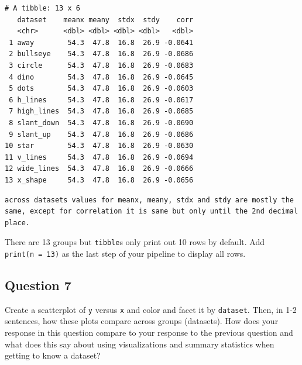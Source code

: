 \documentclass[
  letterpaper,
  DIV=11,
  numbers=noendperiod]{scrartcl}
\begin{document}
\begin{verbatim}
# A tibble: 13 x 6
   dataset    meanx meany  stdx  stdy    corr
   <chr>      <dbl> <dbl> <dbl> <dbl>   <dbl>
 1 away        54.3  47.8  16.8  26.9 -0.0641
 2 bullseye    54.3  47.8  16.8  26.9 -0.0686
 3 circle      54.3  47.8  16.8  26.9 -0.0683
 4 dino        54.3  47.8  16.8  26.9 -0.0645
 5 dots        54.3  47.8  16.8  26.9 -0.0603
 6 h_lines     54.3  47.8  16.8  26.9 -0.0617
 7 high_lines  54.3  47.8  16.8  26.9 -0.0685
 8 slant_down  54.3  47.8  16.8  26.9 -0.0690
 9 slant_up    54.3  47.8  16.8  26.9 -0.0686
10 star        54.3  47.8  16.8  26.9 -0.0630
11 v_lines     54.3  47.8  16.8  26.9 -0.0694
12 wide_lines  54.3  47.8  16.8  26.9 -0.0666
13 x_shape     54.3  47.8  16.8  26.9 -0.0656
\end{verbatim}

\begin{verbatim}
across datasets values for meanx, meany, stdx and stdy are mostly the same, except for correlation it is same but only until the 2nd decimal place.
\end{verbatim}

\begin{tcolorbox}[enhanced jigsaw, rightrule=.15mm, breakable, left=2mm, opacitybacktitle=0.6, toptitle=1mm, colbacktitle=quarto-callout-tip-color!10!white, toprule=.15mm, title=\textcolor{quarto-callout-tip-color}{\faLightbulb}\hspace{0.5em}{Tip}, titlerule=0mm, colframe=quarto-callout-tip-color-frame, bottomrule=.15mm, colback=white, opacityback=0, coltitle=black, bottomtitle=1mm, arc=.35mm, leftrule=.75mm]

There are 13 groups but \texttt{tibble}s only print out 10 rows by
default. Add \texttt{print(n\ =\ 13)} as the last step of your pipeline
to display all rows.

\end{tcolorbox}

\subsection{Question 7}\label{question-7}

Create a scatterplot of \texttt{y} versus \texttt{x} and color and facet
it by \texttt{dataset}. Then, in 1-2 sentences, how these plots compare
across groups (datasets). How does your response in this question
compare to your response to the previous question and what does this say
about using visualizations and summary statistics when getting to know a
dataset?
\end{document}
